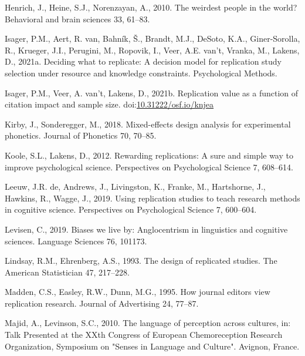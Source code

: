 \documentclass[]{elsarticle} %
\newlength{\cslhangindent}
\newlength{\cslentryspacingunit} %
\newenvironment{CSLReferences}[2] %
 {%
  \setlength{\parindent}{0pt}
  \ifodd #1
  \let\oldpar\par
  \def\par{\hangindent=\cslhangindent\oldpar}
  \fi
  \setlength{\parskip}{#2\cslentryspacingunit}
 }%
 {}
\begin{document}
\begin{CSLReferences}{1}{0}
\leavevmode\hypertarget{ref-henrich2010weirdest}{}%
Henrich, J., Heine, S.J., Norenzayan, A., 2010. The weirdest people in the world? Behavioral and brain sciences 33, 61--83.

\leavevmode\hypertarget{ref-isager2021deciding}{}%
Isager, P.M., Aert, R. van, Bahník, Š., Brandt, M.J., DeSoto, K.A., Giner-Sorolla, R., Krueger, J.I., Perugini, M., Ropovik, I., Veer, A.E. van't, Vranka, M., Lakens, D., 2021a. Deciding what to replicate: A decision model for replication study selection under resource and knowledge constraints. Psychological Methods.

\leavevmode\hypertarget{ref-isager2021replication}{}%
Isager, P.M., Veer, A. van't, Lakens, D., 2021b. Replication value as a function of citation impact and sample size. doi:\href{https://doi.org/10.31222/osf.io/knjea}{10.31222/osf.io/knjea}

\leavevmode\hypertarget{ref-kirby2018mixed}{}%
Kirby, J., Sonderegger, M., 2018. Mixed-effects design analysis for experimental phonetics. Journal of Phonetics 70, 70--85.

\leavevmode\hypertarget{ref-koole_rewarding_2012}{}%
Koole, S.L., Lakens, D., 2012. Rewarding replications: {A} sure and simple way to improve psychological science. Perspectives on Psychological Science 7, 608--614.

\leavevmode\hypertarget{ref-de2019using}{}%
Leeuw, J.R. de, Andrews, J., Livingston, K., Franke, M., Hartshorne, J., Hawkins, R., Wagge, J., 2019. Using replication studies to teach research methods in cognitive science. Perspectives on Psychological Science 7, 600--604.

\leavevmode\hypertarget{ref-levisen2019biases}{}%
Levisen, C., 2019. Biases we live by: Anglocentrism in linguistics and cognitive sciences. Language Sciences 76, 101173.

\leavevmode\hypertarget{ref-lindsay1993design}{}%
Lindsay, R.M., Ehrenberg, A.S., 1993. The design of replicated studies. The American Statistician 47, 217--228.

\leavevmode\hypertarget{ref-madden_how_1995}{}%
Madden, C.S., Easley, R.W., Dunn, M.G., 1995. How journal editors view replication research. Journal of Advertising 24, 77--87.

\leavevmode\hypertarget{ref-majid2010language}{}%
Majid, A., Levinson, S.C., 2010. The language of perception across cultures, in: Talk Presented at the XXth Congress of European Chemoreception Research Organization, Symposium on "Senses in Language and Culture". Avignon, France.


\end{CSLReferences}
\end{document}
